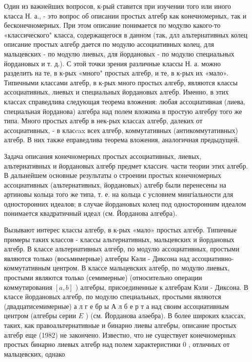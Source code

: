 \documentclass[10pt]{article}
\begin{document}
Один из важнейших вопросов, к-рый ставится при изучении того или иного класса Н. а., - это вопрос об описании простых алгебр как конечномерных, так и бесконечномерных. При этом описание понимается по модулю какого-то «классического" класса, содержащегося в данном (так, длл альтернативных колец описание простых алгебр дается по модулю ассоциативных колец, для мальцевских - по модулю лиевых, для йордановых - по модулю специальных йордановых и т. д.). С этой точки зрения различные классы Н. а. можно разделить на те, в к-рых «много" простых алгебр, и те, в к-рых их «мало». Типичными классами алгебр, в к-рых много простых алгебр, являются классы ассоциативных, лиевых и специальных йордановых алгебр. Именно, в этих классах справедлива следующая теорема вложения: любая ассоциативная (лиева, специальная йорданова) алгебра над полем вложима в простую алгебру того же типа. Много простых алгебр в нек-рых классах алгебр, далеких от ассоциативных, - в класcax всех алгебр, коммутативных (антикоммутативных) алгебр. В них также еправедлива теорема вложения, аналогичная предыдущей.



Задача описания конечномерных простых ассоциативных, лиевых, альтернативных и йордановых алгебр предмет классич. части теории этих алгебр. В дальнейшем основные результаты о строении простых конечномерных ассоциативных (альтернативных, йордановых) алгебр были перенесены на артиновы кольца того же типа, т. е. на кольца с условием мингіальности для односторонних идеалов; в случае йордановых колец под односторонним идеалом понимается квадратичный идеал (см. Йорданова алгебра).



Вызывают интерес классы алгебр, в к-рых «мало» простых алгебр. Типичные примеры таких классов - классы альтернативных, мальцевских и йордановых алгебр. В классе альтернативных алгебр, по модулю ассоциативных, простыми являются только (восьмимерные) алгебры Кәли - Диксона над ассоциативно-коммутативным центром. В классе мальцевских алгебр, по модулю лиевых, простыми являются только (семимерные) (относительно операции коммутирования $[a, b]$ ) алгебры, присоединенные к алгебрам Кэли - Диксона. В классе йордановых алгебр, по модулю специальных, простыми являются (двадцатисемимерные) а л г е бр ы А л б е р т а над своим ассоциативным центром (алгебры серии $E$ ) (см. Йорданова аләебра). В более широких классах, таких, как правоальтернативные и бинарно лиевы алгебры, описание простых алгебр еще (1982) не закончено. Известно, что не существует конечномерных простых бинарно лиевых алгебр над полем характеристики 0 , отличных от мальцевских, однако
\end{document}

